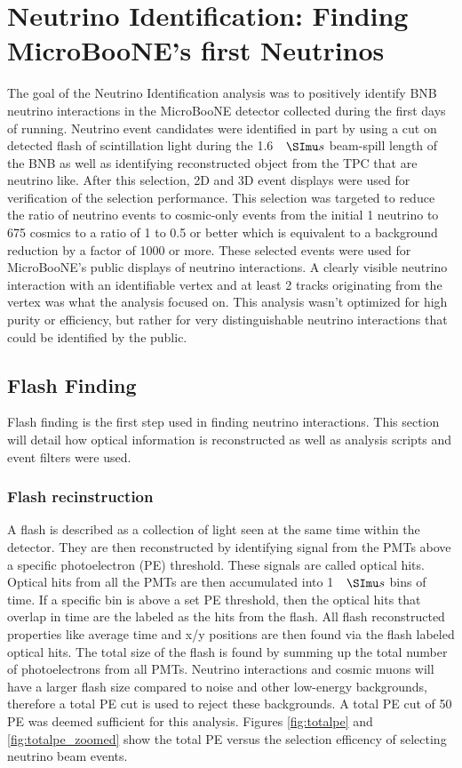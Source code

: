 \chapter{Neutrino Identification: Finding MicroBooNE's first Neutrinos} \label{ch:neutrinoID}
The goal of the Neutrino Identification analysis was to positively identify BNB neutrino interactions in the MicroBooNE detector collected during the first days of running. Neutrino event candidates were identified in part by using a cut on detected flash of scintillation light during the 1.6 $\micro s$ beam-spill length of the BNB as well as identifying reconstructed object from the TPC that are neutrino like. After this selection, 2D and 3D event displays were used for verification of the selection performance. This selection was targeted to reduce the ratio of neutrino events to cosmic-only events from the initial 1 neutrino to 675 cosmics to a ratio of 1 to 0.5 or better which is equivalent to a background reduction by a factor of 1000 or more. These selected events were used for MicroBooNE's public displays of neutrino interactions. A clearly visible neutrino interaction with an identifiable vertex and at least 2 tracks originating from the vertex was what the analysis focused on. This analysis wasn't optimized for high purity or efficiency, but rather for very distinguishable neutrino interactions that could be identified by the public.
\section{Flash Finding}
Flash finding is the first step used in finding neutrino interactions. This section will detail how optical information is reconstructed as well as analysis scripts and event filters were used.
\subsection{Flash recinstruction}
A flash is described as a collection of light seen at the same time within the detector. They are then reconstructed by identifying signal from the PMTs above a specific photoelectron (PE) threshold. These signals are called optical hits. Optical hits from all the PMTs are then accumulated into 1 $\micro s$ bins of time. If a specific bin is above a set PE threshold, then the optical hits that overlap in time are the labeled as the hits from the flash. All flash reconstructed properties like average time and x/y positions are then found via the flash labeled optical hits. The total size of the flash is found by summing up the total number of photoelectrons from all PMTs. Neutrino interactions and cosmic muons will have a larger flash size compared to noise and other low-energy backgrounds, therefore a total PE cut is used to reject these backgrounds. A total PE cut of 50 PE was deemed sufficient for this analysis. Figures \ref{fig:totalpe} and \ref{fig:totalpe_zoomed} show the total PE versus the selection efficency of selecting neutrino beam events. 


